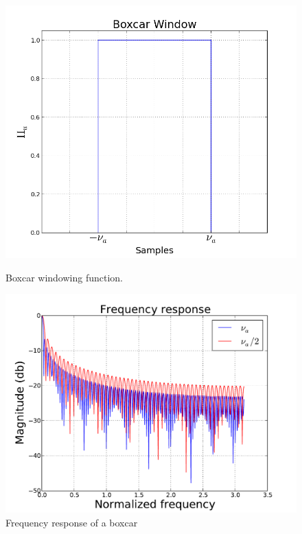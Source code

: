\documentclass[useAMS,usenatbib]{mn2e}
\begin{document}
\\
\\
\\
\begin{figure}
  \centering
  \begin{minipage}{0.36\linewidth}\includegraphics[width=1\textwidth]{./Figures/rect.png}\caption{Boxcar windowing 
function.}\label{fig:fig_box}\end{minipage}
\begin{minipage}{0.36\linewidth}\includegraphics[width=1\textwidth]{./Figures/freq_resp_box.pdf}\caption{Frequency response of a boxcar 
}
\end{minipage}
\end{figure}
\end{document}
